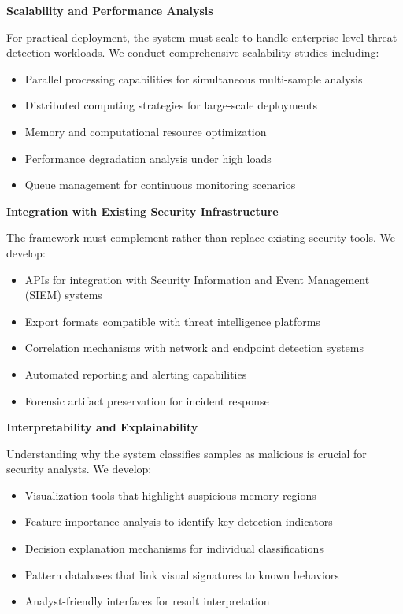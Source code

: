 \textbf{Scalability and Performance Analysis}

For practical deployment, the system must scale to handle enterprise-level threat detection workloads. We conduct comprehensive scalability studies including:
\begin{itemize}
\item Parallel processing capabilities for simultaneous multi-sample analysis
\item Distributed computing strategies for large-scale deployments
\item Memory and computational resource optimization
\item Performance degradation analysis under high loads
\item Queue management for continuous monitoring scenarios
\end{itemize}

\textbf{Integration with Existing Security Infrastructure}

The framework must complement rather than replace existing security tools. We develop:
\begin{itemize}
\item APIs for integration with Security Information and Event Management (SIEM) systems
\item Export formats compatible with threat intelligence platforms
\item Correlation mechanisms with network and endpoint detection systems
\item Automated reporting and alerting capabilities
\item Forensic artifact preservation for incident response
\end{itemize}

\textbf{Interpretability and Explainability}

Understanding why the system classifies samples as malicious is crucial for security analysts. We develop:
\begin{itemize}
\item Visualization tools that highlight suspicious memory regions
\item Feature importance analysis to identify key detection indicators
\item Decision explanation mechanisms for individual classifications
\item Pattern databases that link visual signatures to known behaviors
\item Analyst-friendly interfaces for result interpretation
\end{itemize}

